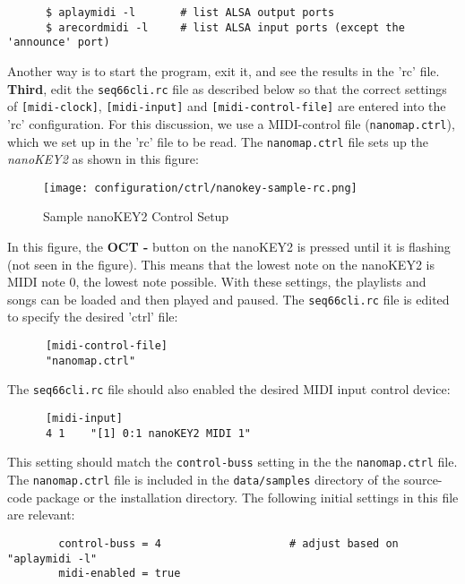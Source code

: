    \begin{verbatim}
      $ aplaymidi -l       # list ALSA output ports
      $ arecordmidi -l     # list ALSA input ports (except the 'announce' port)
   \end{verbatim}

   Another way is to start the program, exit it, and see the results in the
   'rc' file.
   \textbf{Third}, edit the \texttt{seq66cli.rc}
   file as described below so that the correct settings of
   \texttt{[midi-clock]}, \texttt{[midi-input]} and
   \texttt{[midi-control-file]} are entered into the 'rc' configuration.
   For this discussion, we use a MIDI-control file 
   (\texttt{nanomap.ctrl}), which we set up
   in the 'rc' file to be read.
   The \texttt{nanomap.ctrl} file sets up the \textsl{nanoKEY2} as
   shown in this figure:

\begin{figure}[H]
   \centering 
   \texttt{[image: configuration/ctrl/nanokey-sample-rc.png]}
   \caption{Sample nanoKEY2 Control Setup}
   \label{fig:headless_nanokey2_setup}
\end{figure}

   In this figure, the \textbf{OCT -} button on the nanoKEY2 is pressed until
   it is flashing (not seen in the figure).
   This means that the lowest note on the nanoKEY2 is MIDI note 0, the lowest
   note possible.  With these settings, the playlists and songs can be loaded
   and then played and paused.
   The \texttt{seq66cli.rc} file is edited to specify the desired 'ctrl' file:

   \begin{verbatim}
      [midi-control-file]
      "nanomap.ctrl"
   \end{verbatim}

   The \texttt{seq66cli.rc} file should also enabled the desired MIDI input
   control device:

   \begin{verbatim}
      [midi-input]
      4 1    "[1] 0:1 nanoKEY2 MIDI 1"
   \end{verbatim}

   This setting should match the \texttt{control-buss} setting in the
   the \texttt{nanomap.ctrl} file.  The \texttt{nanomap.ctrl} file is included
   in the \texttt{data/samples} directory of the source-code package or the
   installation directory.  The following initial settings in this file are
   relevant:

   \begin{verbatim}
		control-buss = 4					# adjust based on "aplaymidi -l"
		midi-enabled = true
   \end{verbatim}

